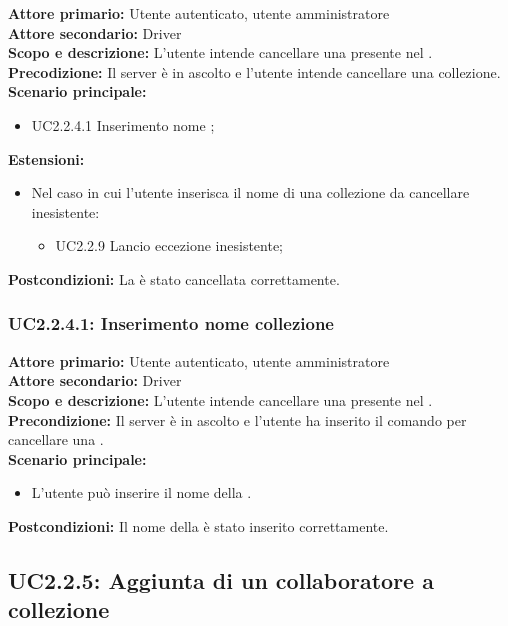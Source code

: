 \documentclass{scalatekids-article}
\begin{document}
\textbf{Attore primario:} Utente autenticato, utente amministratore\\
\textbf{Attore secondario:} Driver\\
\textbf{Scopo e descrizione:} L’utente intende cancellare una  presente nel .\\
\textbf{Precodizione:} Il server è in ascolto e l’utente intende cancellare una collezione.\\
\textbf{Scenario principale:}
\begin{itemize}
\item UC2.2.4.1 Inserimento nome ;
\end{itemize}
\textbf{Estensioni:}
\begin{itemize}
\item Nel caso in cui l'utente inserisca il nome di una collezione da cancellare inesistente:
  \begin{itemize}
  \item UC2.2.9 Lancio eccezione  inesistente;
  \end{itemize}
\end{itemize}
\textbf{Postcondizioni:} La  è stato cancellata correttamente.

\subsubsection{UC2.2.4.1: Inserimento nome collezione}

\textbf{Attore primario:} Utente autenticato, utente amministratore\\
\textbf{Attore secondario:} Driver\\
\textbf{Scopo e descrizione:} L’utente intende cancellare una  presente nel .\\
\textbf{Precondizione:} Il server è in ascolto e l’utente ha inserito il comando per cancellare una .\\
\textbf{Scenario principale:}
\begin{itemize}
\item L'utente può inserire il nome della .
\end{itemize}
\textbf{Postcondizioni:} Il nome della  è stato inserito correttamente.

\subsection{UC2.2.5: Aggiunta di un collaboratore a collezione}
\end{document}
